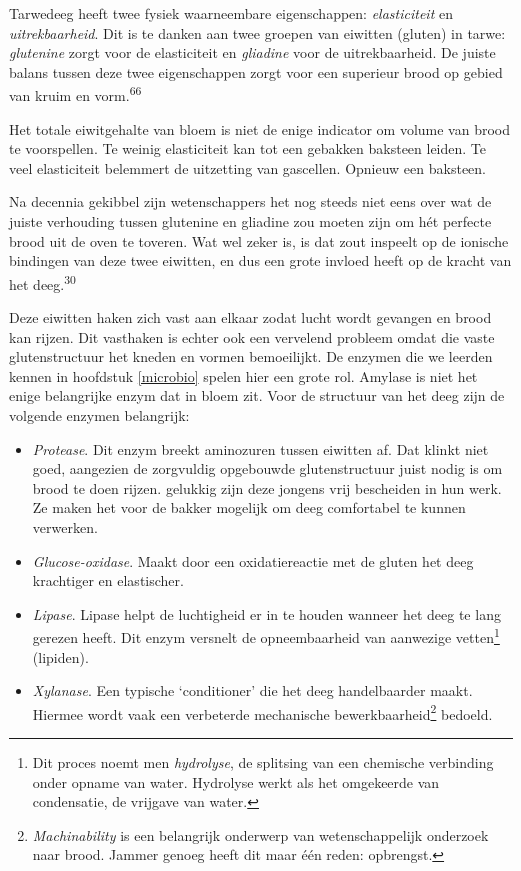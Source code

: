 \documentclass[
  11pt,
  dutch,
]{memoir}
\providecommand{\tightlist}{%
  \setlength{\itemsep}{0pt}\setlength{\parskip}{0pt}}
\begin{document}
Tarwedeeg heeft twee fysiek waarneembare eigenschappen:
\emph{elasticiteit} en \emph{uitrekbaarheid}. Dit is te danken aan twee
groepen van eiwitten (gluten) in tarwe: \emph{glutenine} zorgt voor de
elasticiteit en \emph{gliadine} voor de uitrekbaarheid. De juiste balans
tussen deze twee eigenschappen zorgt voor een superieur brood op gebied
van kruim en vorm.\textsuperscript{66}

Het totale eiwitgehalte van bloem is niet de enige indicator om volume
van brood te voorspellen. Te weinig elasticiteit kan tot een gebakken
baksteen leiden. Te veel elasticiteit belemmert de uitzetting van
gascellen. Opnieuw een baksteen.

Na decennia gekibbel zijn wetenschappers het nog steeds niet eens over
wat de juiste verhouding tussen glutenine en gliadine zou moeten zijn om
hét perfecte brood uit de oven te toveren. Wat wel zeker is, is dat zout
inspeelt op de ionische bindingen van deze twee eiwitten, en dus een
grote invloed heeft op de kracht van het deeg.\textsuperscript{30}

Deze eiwitten haken zich vast aan elkaar zodat lucht wordt gevangen en
brood kan rijzen. Dit vasthaken is echter ook een vervelend probleem
omdat die vaste glutenstructuur het kneden en vormen bemoeilijkt. De
enzymen die we leerden kennen in hoofdstuk \ref{microbio} spelen hier
een grote rol. Amylase is niet het enige belangrijke enzym dat in bloem
zit. Voor de structuur van het deeg zijn de volgende enzymen belangrijk:

\label{enzym}

\begin{itemize}
\tightlist
\item
  \emph{Protease}. Dit enzym breekt aminozuren tussen eiwitten af. Dat
  klinkt niet goed, aangezien de zorgvuldig opgebouwde glutenstructuur
  juist nodig is om brood te doen rijzen. gelukkig zijn deze jongens
  vrij bescheiden in hun werk. Ze maken het voor de bakker mogelijk om
  deeg comfortabel te kunnen verwerken.
\item
  \emph{Glucose-oxidase}. Maakt door een oxidatiereactie met de gluten
  het deeg krachtiger en elastischer.
\item
  \emph{Lipase}. Lipase helpt de luchtigheid er in te houden wanneer het
  deeg te lang gerezen heeft. Dit enzym versnelt de opneembaarheid van
  aanwezige vetten\footnote{Dit proces noemt men \emph{hydrolyse}, de
    splitsing van een chemische verbinding onder opname van water.
    Hydrolyse werkt als het omgekeerde van condensatie, de vrijgave van
    water.} (lipiden).
\item
  \emph{Xylanase}. Een typische `conditioner' die het deeg handelbaarder
  maakt. Hiermee wordt vaak een verbeterde mechanische
  bewerkbaarheid\footnote{\emph{Machinability} is een belangrijk
    onderwerp van wetenschappelijk onderzoek naar brood. Jammer genoeg
    heeft dit maar één reden: opbrengst.} bedoeld.
\end{itemize}
\end{document}

